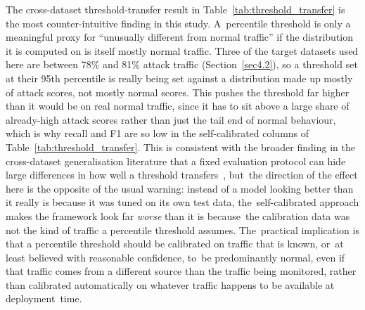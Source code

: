 \documentclass[futureinternet,article,accept,moreauthors]{Definitions/mdpi}
\begin{document}
The cross-dataset threshold-transfer result in Table~\ref{tab:threshold_transfer} is the most counter-intuitive finding in this study. A~percentile threshold is only a meaningful proxy for ``unusually different from normal traffic'' if the distribution it is computed on is itself mostly normal traffic. Three of the target datasets used here are between 78\% and 81\% attack traffic (\mbox{Section~\ref{sec4.2}}), so a threshold set at their 95th percentile is really being set against a distribution made up mostly of attack scores, not mostly normal scores. This pushes the threshold far higher than it would be on real normal traffic, since it has to sit above a large share of already-high attack scores rather than just the tail end of normal behaviour, which is why recall and F1 are so low in the self-calibrated columns of Table~\ref{tab:threshold_transfer}. This is consistent with the broader finding in the cross-dataset generalisation literature that a fixed evaluation protocol can hide large differences in how well a threshold transfers~\cite{cantone2024}, but~the direction of the effect here is the opposite of the usual warning: instead of a model looking better than it really is because it was tuned on its own test data, the~self-calibrated approach makes the framework look far \emph{worse} than it is because~the calibration data was not the kind of traffic a percentile threshold assumes. The~practical implication is that a percentile threshold should be calibrated on traffic that is known, or~at least believed with reasonable confidence, to~be predominantly normal, even if that traffic comes from a different source than the traffic being monitored, rather than calibrated automatically on whatever traffic happens to be available at deployment~time.
\end{document}
